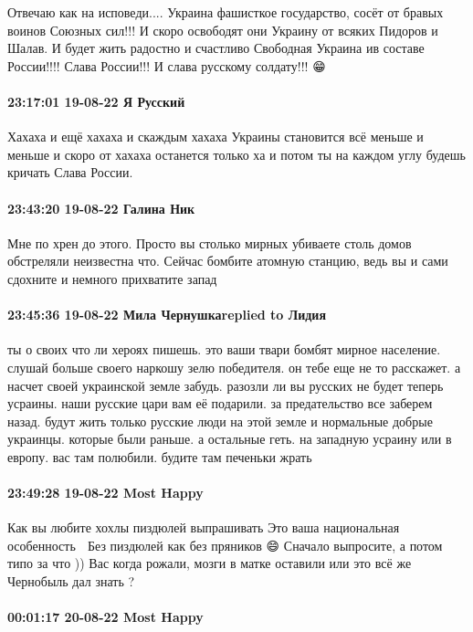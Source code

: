Отвечаю как на исповеди.... Украина фашисткое государство, сосёт от бравых
воинов Союзных сил!!! И скоро освободят они Украину от всяких Пидоров и Шалав.
И будет жить радостно и счастливо Свободная Украина ив составе России!!!! Слава
России!!! И слава русскому солдату!!! 😁

\paragraph{23:17:01 19-08-22 Я Русский}

Хахаха и ещё хахаха и скаждым хахаха Украины становится всё меньше и меньше и
скоро от хахаха останется только ха и потом ты на каждом углу будешь кричать
Слава России.

\paragraph{23:43:20 19-08-22 Галина Ник}

Мне по хрен до этого. Просто вы столько мирных убиваете столь домов обстреляли
неизвестна что. Сейчас бомбите атомную станцию, ведь вы и сами сдохните и
немного прихватите запад

\paragraph{23:45:36 19-08-22 Мила Чернушкаreplied to Лидия}

ты о своих что ли хероях пишешь. это ваши твари бомбят мирное население. слушай
больше своего наркошу зелю победителя. он тебе еще не то расскажет. а насчет
своей украинской земле забудь. разозли ли вы русских не будет теперь усраины.
наши русские цари вам её подарили. за предательство все заберем назад. будут
жить только русские люди на этой земле и нормальные добрые украинцы. которые
были раньше. а остальные геть. на западную усраину или в европу. вас там
полюбили. будите там печеньки жрать

\paragraph{23:49:28 19-08-22 Most Happy}

Как вы любите хохлы пиздюлей выпрашивать 
Это ваша национальная особенность 🤧
Без пиздюлей как без пряников 😄
Сначало выпросите,  а потом типо за что )) 
Вас когда рожали,  мозги в матке оставили или это всё же Чернобыль дал знать ? 🤔

\paragraph{00:01:17 20-08-22 Most Happy}

